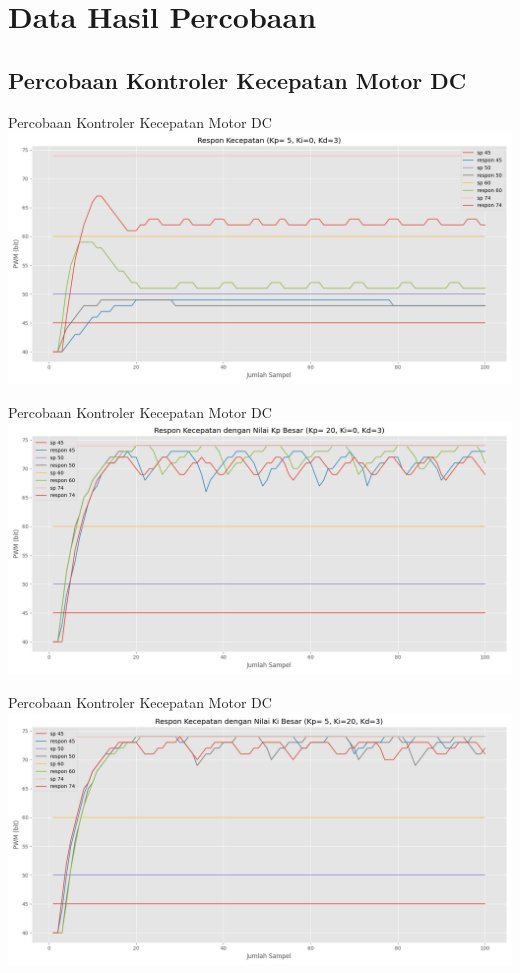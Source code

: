 \documentclass[10pt,xcolor={dvipsnames}]{beamer}
\begin{document}
\section{Data Hasil Percobaan}
\subsection*{Percobaan Kontroler Kecepatan Motor DC}
	\begin{frame}{Percobaan Kontroler Kecepatan Motor DC}
		\centering
		\includegraphics[width=14cm]{Graph/speed.png}
	\end{frame}
	\begin{frame}{Percobaan Kontroler Kecepatan Motor DC}
		\centering
		\includegraphics[width=14cm]{Graph/speedKpBesar.png}
	\end{frame}
	\begin{frame}{Percobaan Kontroler Kecepatan Motor DC}
		\centering
		\includegraphics[width=14cm]{Graph/speedKiBesar.png}
	\end{frame}
\end{document}
